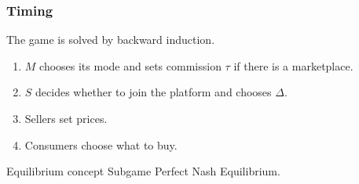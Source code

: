 \begin{frame}
  \frametitle{Timing}
  \small
  The game is solved by backward induction.

  \begin{enumerate}
    \item $M$ chooses its mode and sets commission $\tau$ if there is a marketplace.
    \item $S$ decides whether to join the platform and chooses $\Delta$.
    \item Sellers set prices.
    \item Consumers choose what to buy.
  \end{enumerate}

  \begin{block}{Equilibrium concept}
    Subgame Perfect Nash Equilibrium.
  \end{block}
\end{frame}
